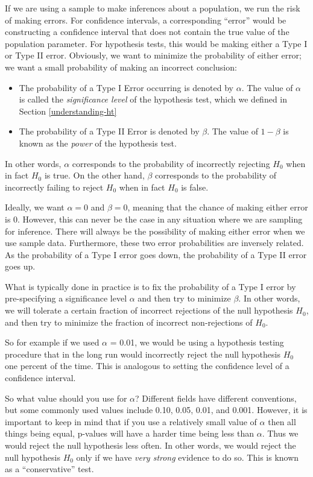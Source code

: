 \documentclass[
]{book}
\providecommand{\tightlist}{%
  \setlength{\itemsep}{0pt}\setlength{\parskip}{0pt}}
\begin{document}
If we are using a sample to make inferences about a population, we run the risk of making errors. For confidence intervals, a corresponding ``error'' would be constructing a confidence interval that does not contain the true value of the population parameter. For hypothesis tests, this would be making either a Type I or Type II error. Obviously, we want to minimize the probability of either error; we want a small probability of making an incorrect conclusion:

\begin{itemize}
\tightlist
\item
  The probability of a Type I Error occurring is denoted by \(\alpha\). The value of \(\alpha\) is called the \emph{significance level} of the hypothesis test, which we defined in Section \ref{understanding-ht}
\item
  The probability of a Type II Error is denoted by \(\beta\). The value of \(1-\beta\) is known as the \emph{power} of the hypothesis test.
\end{itemize}

In other words, \(\alpha\) corresponds to the probability of incorrectly rejecting \(H_0\) when in fact \(H_0\) is true. On the other hand, \(\beta\) corresponds to the probability of incorrectly failing to reject \(H_0\) when in fact \(H_0\) is false.

Ideally, we want \(\alpha = 0\) and \(\beta = 0\), meaning that the chance of making either error is 0. However, this can never be the case in any situation where we are sampling for inference. There will always be the possibility of making either error when we use sample data. Furthermore, these two error probabilities are inversely related. As the probability of a Type I error goes down, the probability of a Type II error goes up.

What is typically done in practice is to fix the probability of a Type I error by pre-specifying a significance level \(\alpha\) and then try to minimize \(\beta\). In other words, we will tolerate a certain fraction of incorrect rejections of the null hypothesis \(H_0\), and then try to minimize the fraction of incorrect non-rejections of \(H_0\).

So for example if we used \(\alpha\) = 0.01, we would be using a hypothesis testing procedure that in the long run would incorrectly reject the null hypothesis \(H_0\) one percent of the time. This is analogous to setting the confidence level of a confidence interval.

So what value should you use for \(\alpha\)?  Different fields have different conventions, but some commonly used values include 0.10, 0.05, 0.01, and 0.001. However, it is important to keep in mind that if you use a relatively small value of \(\alpha\) then all things being equal, p-values will have a harder time being less than \(\alpha\). Thus we would reject the null hypothesis less often. In other words, we would reject the null hypothesis \(H_0\) only if we have \emph{very strong} evidence to do so. This is known as a ``conservative'' test.
\end{document}
